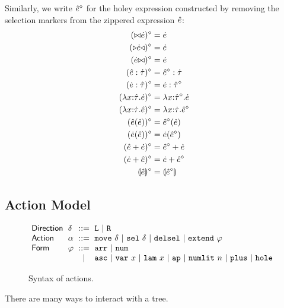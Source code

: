 \documentclass{llncs}
\begin{document}
Similarly, we write $\hat{e}^{\diamond}$ for the holey expression constructed by removing the selection markers from the zippered expression $\hat{e}$:
\begin{align*}
({\bowtie}{\dot{e}})^{\diamond} & = \dot{e}\\
({\triangleright}{\dot{e}}{\triangleleft})^{\diamond} & = \dot{e}\\
({\dot{e}}{\bowtie})^{\diamond} & = \dot{e}\\
(\hat{e} : \dot{\tau})^{\diamond} & = \hat{e}^{\diamond} : \dot{\tau}\\
(\dot{e} : \hat{\tau})^{\diamond} & = \dot{e} : \hat{\tau}^{\diamond}\\
(\lambda x{:}\hat{\tau}.\dot{e})^{\diamond} & = \lambda x{:}\hat{\tau}^{\diamond}.\dot{e}\\
(\lambda x{:}\dot{\tau}.\hat{e})^{\diamond} & = \lambda x{:}\dot{\tau}.\hat{e}^{\diamond}\\
(\hat{e}(\dot{e}))^{\diamond} & = \hat{e}^{\diamond}(\dot{e})\\
(\dot{e}(\hat{e}))^{\diamond} & = \dot{e}(\hat{e}^{\diamond})\\
(\hat{e} + \dot{e})^{\diamond} & = \hat{e}^{\diamond} + \dot{e}\\
(\dot{e} + \hat{e})^{\diamond} & = \dot{e} + \hat{e}^{\diamond}\\
\llparenthesis\hat{e}\rrparenthesis^{\diamond} &= \llparenthesis\hat{e}^{\diamond}\rrparenthesis
\end{align*}

\subsection{Action Model}
\begin{figure}
\hspace{-3px}$\arraycolsep=3pt\begin{array}{llcllll}
\mathsf{Direction} & \delta & ::= & 
  \dLeft ~\vert~
  \dRight\\
\mathsf{Action} & \alpha & ::= & 
  \aMove{\delta} ~\vert~
  \aSelect{\delta} ~\vert~
  \aDel ~\vert~
  \aExtend{\varphi}\\
\mathsf{Form} & \varphi & ::= & 
  \farr ~\vert~
  \fnum \\
& & \vert & 
  \fasc ~\vert~
  \fvar{x} ~\vert~
  \flam{x} ~\vert~
  \fap ~\vert~
  \fnumlit{n} ~\vert~
  \fplus ~\vert~
  \fhole
\end{array}$
\caption{Syntax of actions.}
\label{fig:action-syntax}
\end{figure}
There are many ways to interact with a tree. 
\end{document}
